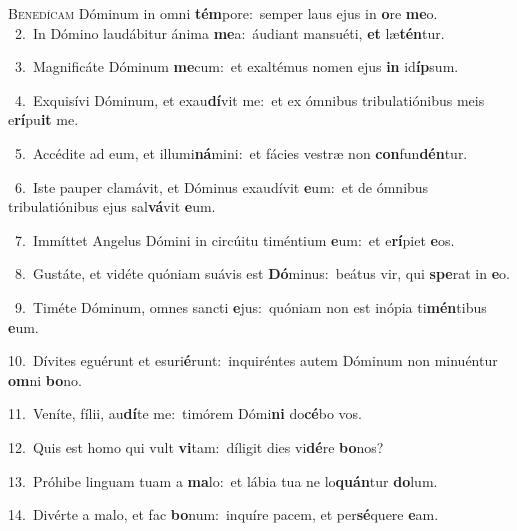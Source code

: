 \lettrine{\initial\textcolor{\initialcolor}{B}}{enedícam} Dóminum in omni \textbf{tém}\-pore:~\star semper laus ejus in \textbf{o}\-re \textbf{me}\-o.\\
{\numbfont\textcolor{\numbcolor}{~2.}}~In Dómino laudábitur ánima \textbf{me}\-a:~\star áudiant mansuéti, \textbf{et} læ\-\textbf{tén}\-tur.\par
{\numbfont\textcolor{\numbcolor}{~3.}}~Magnificáte Dóminum \textbf{me}\-cum:~\star et exaltémus nomen ejus \textbf{in} id\-\textbf{íp}\-sum.\par
{\numbfont\textcolor{\numbcolor}{~4.}}~Exquisívi Dóminum, et exau\-\textbf{dí}\-vit me:~\star et ex ómnibus tribulatiónibus meis e\-\textbf{rí}\-pu\textbf{it} me.\par
{\numbfont\textcolor{\numbcolor}{~5.}}~Accédite ad eum, et illumi\-\textbf{ná}\-mini:~\star et fácies vestræ non \textbf{con}\-fun\-\textbf{dén}\-tur.\par
{\numbfont\textcolor{\numbcolor}{~6.}}~Iste pauper clamávit, et Dóminus exaudívit \textbf{e}\-um:~\star et de ómnibus tribulatiónibus ejus sal\-\textbf{vá}\-vit \textbf{e}\-um.\par
{\numbfont\textcolor{\numbcolor}{~7.}}~Immíttet Angelus Dómini in circúitu timéntium \textbf{e}\-um:~\star et e\-\textbf{rí}\-piet \textbf{e}\-os.\par
{\numbfont\textcolor{\numbcolor}{~8.}}~Gustáte, et vidéte quóniam suávis est \textbf{Dó}\-minus:~\star beátus vir, qui \textbf{spe}\-rat in \textbf{e}\-o.\par
{\numbfont\textcolor{\numbcolor}{~9.}}~Timéte Dóminum, omnes sancti \textbf{e}\-jus:~\star quóniam non est inópia ti\-\textbf{mén}\-tibus \textbf{e}\-um.\par
{\numbfont\textcolor{\numbcolor}{10.}}~Dívites eguérunt et esuri\-\textbf{é}\-runt:~\star inquiréntes autem Dóminum non minuéntur \textbf{om}\-ni \textbf{bo}\-no.\par
{\numbfont\textcolor{\numbcolor}{11.}}~Veníte, fílii, au\-\textbf{dí}\-te me:~\star timórem Dómi\textbf{ni} do\-\textbf{cé}\-bo vos.\par
{\numbfont\textcolor{\numbcolor}{12.}}~Quis est homo qui vult \textbf{vi}\-tam:~\star díligit dies vi\-\textbf{dé}\-re \textbf{bo}\-nos?\par
{\numbfont\textcolor{\numbcolor}{13.}}~Próhibe linguam tuam a \textbf{ma}\-lo:~\star et lábia tua ne lo\-\textbf{quán}\-tur \textbf{do}\-lum.\par
{\numbfont\textcolor{\numbcolor}{14.}}~Divérte a malo, et fac \textbf{bo}\-num:~\star inquíre pacem, et per\-\textbf{sé}\-quere \textbf{e}\-am.\par
